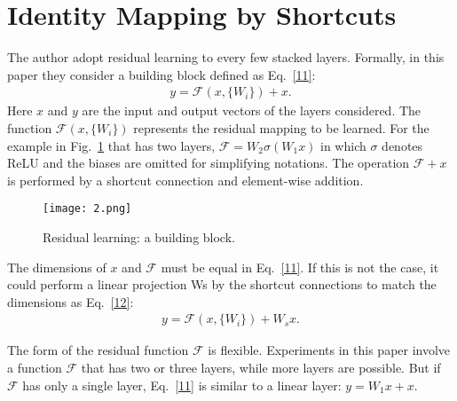 \documentclass[10pt,twocolumn,letterpaper]{article}
\begin{document}
\section{Identity Mapping by Shortcuts}
The author adopt residual learning to every few stacked layers. Formally, in this paper they consider a building block defined as Eq.~\ref{11}:
\begin{equation}\label{11}
\begin{split}
y=\mathcal{F}(x,\{W_i\})+x.
\end{split}
\end{equation}
Here $x$ and $y$ are the input and output vectors of the layers considered. The function $\mathcal{F}(x,\{W_i\})$ represents the residual mapping to be learned. For the example in Fig.~\ref{2} that has two layers, $\mathcal{F}=W_2\sigma(W_1x)$ in which $\sigma$ denotes ReLU \cite{Nair2010Rectified} and the biases are omitted for simplifying notations. The operation $\mathcal{F}+x$ is performed by a shortcut connection and element-wise addition.
\begin{figure}
\begin{center}
  \texttt{[image: 2.png]}\\
  \caption{Residual learning: a building block.}\label{2}
\end{center}
\end{figure}
\par
The dimensions of $x$ and $\mathcal{F}$ must be equal in Eq.~\ref{11}. If this is not the case, it could  perform a linear projection Ws by the shortcut connections to match the dimensions as Eq.~\ref{12}:
\begin{equation}\label{12}
\begin{split}
y=\mathcal{F}(x,\{W_i\})+W_sx.
\end{split}
\end{equation}
\par
The form of the residual function $\mathcal{F}$ is flexible. Experiments in this paper involve a function $\mathcal{F}$ that has two or three layers, while more layers are possible. But if $\mathcal{F}$ has only a single layer, Eq.~\ref{11} is similar to a linear layer: $y=W_1x+x$.
\end{document}
